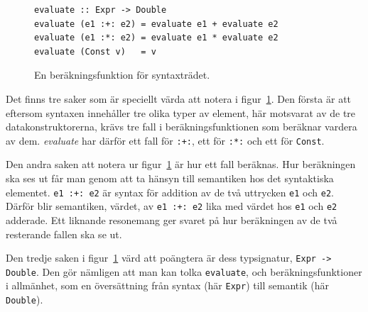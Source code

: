 \begin{draft}
\begin{figure}[tph]
  \begin{lstlisting}
evaluate :: Expr -> Double
evaluate (e1 :+: e2) = evaluate e1 + evaluate e2
evaluate (e1 :*: e2) = evaluate e1 * evaluate e2
evaluate (Const v)   = v
  \end{lstlisting}
  \caption{En beräkningsfunktion för syntaxträdet.}\label{fig:eval_tree}
\end{figure}

Det finns tre saker som är speciellt värda att notera i
figur~\ref{fig:eval_tree}. Den första är att eftersom syntaxen innehåller tre olika
typer av element, här motsvarat av de tre datakonstruktorerna, krävs tre fall i
beräkningsfunktionen som beräknar vardera av dem. \textit{evaluate} har
därför ett fall för \texttt{:+:}, ett för \texttt{:*:} och ett för
\texttt{Const}. 

Den andra saken att notera ur figur~\ref{fig:eval_tree} är hur ett fall
beräknas. Hur beräkningen ska ses ut får man genom att ta hänsyn till
semantiken hos det syntaktiska elementet. \texttt{e1 :+: e2} är syntax för
addition av de två uttrycken \texttt{e1} och \texttt{e2}. Därför blir
semantiken, värdet, av \texttt{e1 :+: e2} lika med värdet hos \texttt{e1} och
\texttt{e2} adderade. Ett liknande resonemang ger svaret på hur beräkningen av
de två resterande fallen ska se ut.

Den tredje saken i figur~\ref{fig:eval_tree} värd att poängtera är dess
typsignatur, \texttt{Expr -> Double}. Den gör nämligen att man kan tolka
\texttt{evaluate}, och beräkningsfunktioner i allmänhet, som en översättning
från syntax (här \texttt{Expr}) till semantik (här \texttt{Double}).

\end{draft}


